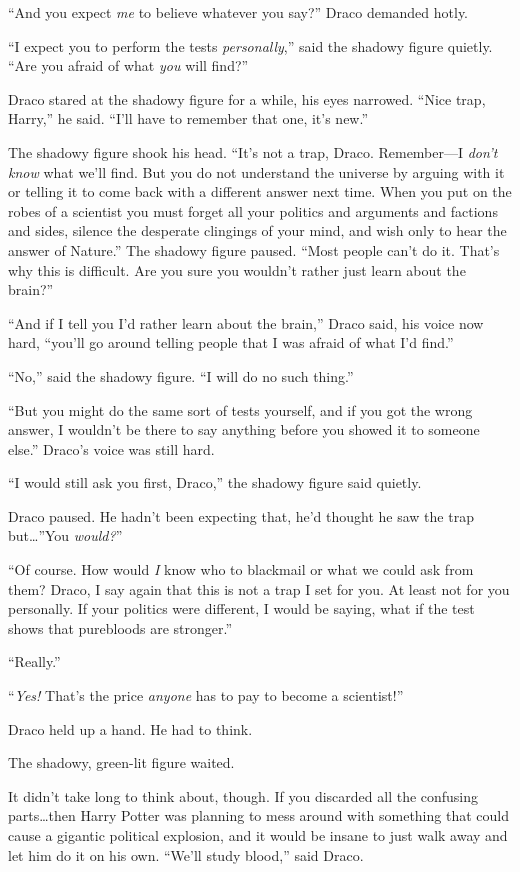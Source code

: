 “And you expect \emph{me} to believe whatever you say?” Draco demanded hotly.

“I expect you to perform the tests \emph{personally},” said the shadowy figure
quietly. “Are you afraid of what \emph{you} will find?”

Draco stared at the shadowy figure for a while, his eyes narrowed. “Nice trap,
Harry,” he said. “I’ll have to remember that one, it’s new.”

The shadowy figure shook his head. “It’s not a trap, Draco. Remember—I
\emph{don’t know} what we’ll find. But you do not understand the universe by
arguing with it or telling it to come back with a different answer next time.
When you put on the robes of a scientist you must forget all your politics and
arguments and factions and sides, silence the desperate clingings of your mind,
and wish only to hear the answer of Nature.” The shadowy figure paused. “Most
people can’t do it. That’s why this is difficult. Are you sure you wouldn’t
rather just learn about the brain?”

“And if I tell you I’d rather learn about the brain,” Draco said, his voice now
hard, “you’ll go around telling people that I was afraid of what I’d find.”

“No,” said the shadowy figure. “I will do no such thing.”

“But you might do the same sort of tests yourself, and if you got the wrong
answer, I wouldn’t be there to say anything before you showed it to someone
else.” Draco’s voice was still hard.

“I would still ask you first, Draco,” the shadowy figure said quietly.

Draco paused. He hadn’t been expecting that, he’d thought he saw the trap
but…”You \emph{would?}”

“Of course. How would \emph{I} know who to blackmail or what we could ask from
them? Draco, I say again that this is not a trap I set for you. At least not
for you personally. If your politics were different, I would be saying, what if
the test shows that purebloods are stronger.”

“Really.”

“\emph{Yes!} That’s the price \emph{anyone} has to pay to become a scientist!”

Draco held up a hand. He had to think.

The shadowy, green-lit figure waited.

It didn’t take long to think about, though. If you discarded all the confusing
parts…then Harry Potter was planning to mess around with something that
could cause a gigantic political explosion, and it would be insane to just walk
away and let him do it on his own. “We’ll study blood,” said Draco.

